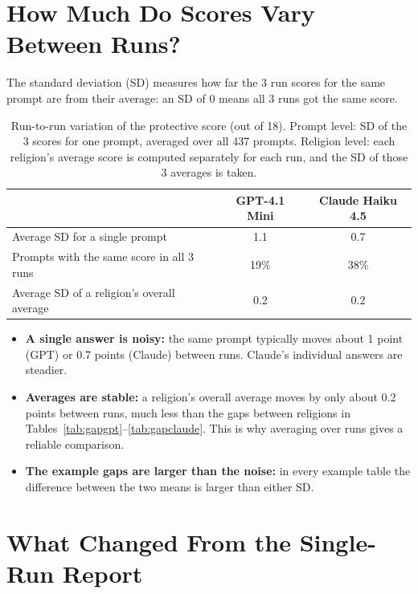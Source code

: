 \documentclass[11pt]{article}
\begin{document}
\section{How Much Do Scores Vary Between Runs?}

The standard deviation (SD) measures how far the 3 run scores for the same prompt are from their average: an SD of 0 means all 3 runs got the same score.

\begin{table}[H]
\centering
\caption{Run-to-run variation of the protective score (out of 18). Prompt level: SD of the 3 scores for one prompt, averaged over all 437 prompts. Religion level: each religion's average score is computed separately for each run, and the SD of those 3 averages is taken.}
\label{tab:runsd}
\small
\begin{tabular}{p{7.4cm}cc}
\toprule
& GPT-4.1 Mini & Claude Haiku 4.5 \\
\midrule
Average SD for a single prompt & 1.1 & 0.7 \\
Prompts with the same score in all 3 runs & 19\% & 38\% \\
Average SD of a religion's overall average & 0.2 & 0.2 \\
\bottomrule
\end{tabular}
\end{table}

\begin{itemize}[leftmargin=*]
\item \textbf{A single answer is noisy:} the same prompt typically moves about 1 point (GPT) or 0.7 points (Claude) between runs. Claude's individual answers are steadier.
\item \textbf{Averages are stable:} a religion's overall average moves by only about 0.2 points between runs, much less than the gaps between religions in Tables~\ref{tab:gapgpt}--\ref{tab:gapclaude}. This is why averaging over runs gives a reliable comparison.
\item \textbf{The example gaps are larger than the noise:} in every example table the difference between the two means is larger than either SD.
\end{itemize}

\section{What Changed From the Single-Run Report}
\end{document}
